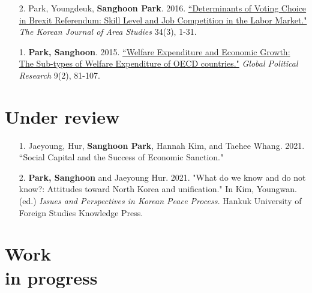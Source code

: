 \documentclass[margin,line]{res}
\begin{document}
\begin{resume}
\begin{enumerate}[leftmargin=*]
\item[2.] Park, Youngdeuk, \textbf{Sanghoon Park}. 2016. \href{http://kiss.kstudy.com/thesis/thesis-view.asp?key=3472800}{``Determinants of Voting Choice in Brexit Referendum: Skill Level and Job Competition in the Labor Market."} \textit{The Korean Journal of Area Studies} 34(3), 1-31.	
\item[1.] \textbf{Park, Sanghoon}. 2015. \href{http://search.koreanstudies.net/thesis/thesis-view.asp?key=3438155}{``Welfare Expenditure and Economic Growth: The Sub-types of Welfare Expenditure of OECD countries."} \textit{Global Political Research} 9(2), 81-107.	
\end{enumerate}
\newpage
\section{\sc Under review}

\begin{enumerate}[leftmargin=*]
\item[1.] Jaeyoung, Hur, \textbf{Sanghoon Park}, Hannah Kim, and Taehee Whang. 2021. ``Social Capital and the Success of Economic Sanction."
\item[2.] \textbf{Park, Sanghoon} and Jaeyoung Hur. 2021. "What do we know and do not know?: Attitudes toward North Korea and unification." In Kim, Youngwan. (ed.) {\it Issues and Perspectives in Korean Peace Process.} Hankuk University of Foreign Studies Knowledge Press.
\end{enumerate}



\section{\sc Work\\in progress}


\end{resume}
\end{document}
